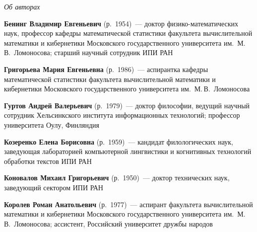 \begin{center}\LARGE
\textit{Об авторах}
\end{center}
\thispagestyle{empty}


\vspace*{12pt}


\begin{multicols}{2}


\noindent
\textbf{Бенинг Владимир Евгеньевич} (р.\ 1954)~---  доктор физико-математических наук, 
профессор ка\-фед\-ры математической статистики факультета вы\-чис\-ли\-тель\-ной 
математики  и кибернетики Московского государственного университета им.\ М.\,В.~Ломоносова;
старший научный сотрудник ИПИ РАН

\vspace*{3pt}

\noindent
\textbf{Григорьева Мария Евгеньевна} (р.\ 1986)~--- аспирантка 
кафедры математической статистики факультета вычислительной математики и кибернетики 
Московского государственного университета им.\ М.\,В.~Ломоносова

\vspace*{3pt}

\noindent
\textbf{Гуртов Андрей Валерьевич} (р.\ 1979)~--- доктор философии, ведущий научный
сотрудник Хельсинкского института информационных технологий;
профессор университета Оулу, Финляндия

\vspace*{3pt}

\noindent
\textbf{Козеренко Елена Борисовна} (р.\ 1959)~--- 
кандидат филологических наук, заведующая лабораторией компьютерной лингвистики и 
когнитивных технологий обработки текстов ИПИ РАН


\vspace*{3pt}

\noindent
\textbf{Коновалов Михаил Григорьевич} (р.\ 1950)~--- доктор технических наук, заведующий
сектором ИПИ РАН

\vspace*{3pt}

\noindent
\textbf{Королев Роман Анатольевич} (р.\ 1977)~--- аспирант факультета вы\-чис\-ли\-тель\-ной 
математики  и кибернетики Московского государственного университета им.\ М.\,В.~Ломоносова;
ассистент, Российский университет дружбы народов 


\end{multicols}
